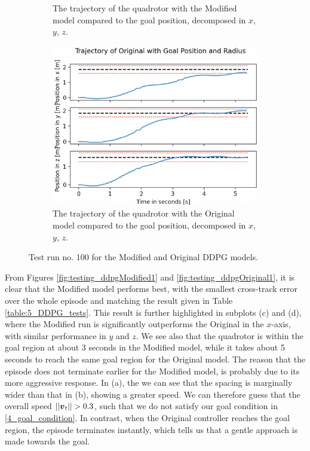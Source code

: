 \begin{figure}[H]
\begin{subfigure}[b]{0.49\textwidth}
         \caption{The trajectory of the quadrotor with the Modified model compared to the goal position, decomposed in $x$, $y$, $z$.}
         \label{fig:testing_ddpgModified2}
     \end{subfigure} 
     \hfill 
     \begin{subfigure}[b]{0.49\textwidth}
         \centering
         \captionsetup{justification=centering}
         \includegraphics[width=\textwidth]{figures/5_/Testing/ddpg_test_original2.png}
         \caption{The trajectory of the quadrotor with the Original model compared to the goal position, decomposed in $x$, $y$, $z$.}
         \label{fig:testing_ddpgOriginal2}
     \end{subfigure} 
    \captionsetup{justification=centering}
    \caption{Test run no. 100 for the Modified and Original DDPG models.}
     \label{fig:5_testing_DDPG}
\end{figure}
From Figures \ref{fig:testing_ddpgModified1} and \ref{fig:testing_ddpgOriginal1}, it is clear that the Modified model performs best, with the smallest cross-track error over the whole episode and matching the result given in Table \ref{table:5_DDPG_tests}. This result is further highlighted in subplots (c) and (d), where the Modified run is significantly outperforms the Original in the $x$-axis, with similar performance in $y$ and $z$. We see also that the quadrotor is within the goal region at about 3 seconds in the Modified model, while it takes about 5 seconds to reach the same goal region for the Original model. The reason that the episode does not terminate earlier for the Modified model, is probably due to its more aggressive response. In (a), the we can see that the spacing is marginally wider than that in (b), showing a greater speed. We can therefore guess that the overall speed $||{\boldsymbol{v}}_t|| > 0.3$, such that we do not satisfy our goal condition in \eqref{4_goal_condition}. In contrast, when the Original controller reaches the goal region, the episode terminates instantly, which tells us that a gentle approach is made towards the goal. 

